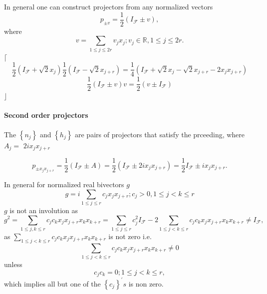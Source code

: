\documentclass[aps,preprint]{revtex4}%
\begin{document}
In general one can construct projectors from any normalized vectors
\begin{equation}
p_{\pm v}=\frac{1}{2}\left(  I_{\mathcal{F}}\pm v\right)  ,
\end{equation}
where%
\begin{equation}
v=\sum_{1\leq j\leq2r}v_{j}x_{j};v_{j}\in\mathbb{R},1\leq j\leq2r.
\end{equation}
$\lceil$%
\begin{equation}
\frac{1}{2}\left(  I_{\mathcal{F}}+\sqrt{2}x_{j}\right)  \frac{1}{2}\left(
I_{\mathcal{F}}-\sqrt{2}x_{j+r}\right)  =\frac{1}{4}\left(  I_{\mathcal{F}%
}+\sqrt{2}x_{j}-\sqrt{2}x_{j+r}-2x_{j}x_{j+r}\right)
\end{equation}%
\begin{equation}
\frac{1}{2}\left(  I_{\mathcal{F}}\pm v\right)  v=\frac{1}{2}\left(  v\pm
I_{\mathcal{F}}\right)
\end{equation}
$\rfloor$

\paragraph{Second order projectors}

The $\left\{  n_{j}\right\}  $ and $\left\{  h_{j}\right\}  $ are pairs of
projectors that satisfy the prceeding, where $A_{j}=$ $2ix_{j}x_{j+r}$%

\begin{equation}
p_{\pm x_{j}x_{j+r}}=\frac{1}{2}\left(  I_{\mathcal{F}}\pm A\right)  =\frac
{1}{2}\left(  I_{\mathcal{F}}\pm2ix_{j}x_{j+r}\right)  =\frac{1}%
{2}I_{\mathcal{F}}\pm ix_{j}x_{j+r}.
\end{equation}


In general for normalized real bivectors $g$
\begin{equation}
g=i\sum_{1\leq j\leq r}c_{j}x_{j}x_{j+r};c_{j}>0,1\leq j<k\leq r
\end{equation}
$g$ is not an involution as
\begin{equation}
g^{2}=\sum_{1\leq j,k\leq r}c_{j}c_{k}x_{j}x_{j+r}x_{k}x_{k+r}=\sum_{1\leq
j\leq r}c_{j}^{2}I_{\mathcal{F}}-2\sum_{1\leq j<k\leq r}c_{j}c_{k}x_{j}%
x_{j+r}x_{k}x_{k+r}\neq I_{\mathcal{F}},
\end{equation}
as $\sum_{1\leq j<k\leq r}c_{j}c_{k}x_{j}x_{j+r}x_{k}x_{k+r}$ is not zero
i.e.
\begin{equation}
\sum_{1\leq j<k\leq r}c_{j}c_{k}x_{j}x_{j+r}x_{k}x_{k+r}\neq0
\end{equation}
unless
\begin{equation}
c_{j}c_{k}=0;1\leq j<k\leq r,
\end{equation}
which implies all but one of the $\left\{  c_{j}\right\}  ^{\prime}s$ is non zero.
\end{document}
